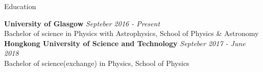 \documentclass{resume} %
\begin{document}

\begin{rSection}{Education}

{\bf University of Glasgow} \hfill {\em Septeber 2016 - Present} 
\\ Bachelor of science in Physics with Astrophysics, School of Physics \& Astronomy
\vspace{5pt}\\
{\bf Hongkong University of Science and Technology} \hfill {\em Septeber 2017 - June 2018}
\\ Bachelor of science(exchange) in Physics, School of Physics

\end{rSection}
\end{document}
